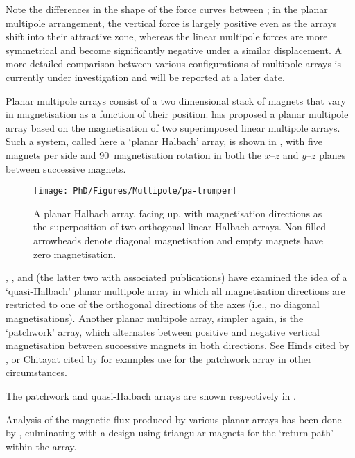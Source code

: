 \documentclass[11pt,a4paper]{memoir}
\begin{document}
Note the differences in the shape of the force curves between ; in the planar multipole arrangement, the vertical force is largely positive even as the arrays shift into their attractive zone, whereas the linear multipole forces are more symmetrical and become significantly negative under a similar displacement. A more detailed comparison between various configurations of multipole arrays is currently under investigation and will be reported at a later date.

Planar multipole arrays consist of a two dimensional stack of magnets that vary in magnetisation as a function of their position. \textcite[Appendix~A]{kim1997-thesis} has proposed a planar multipole array based on the magnetisation of two superimposed linear multipole arrays. Such a system, called here a `planar Halbach' array, is shown in , with five magnets per side and 90\textdegree\ magnetisation rotation in both the $x$--$z$ and $y$--$z$ planes between successive magnets.

\begin{figure}
\centering
\texttt{[image: PhD/Figures/Multipole/pa-trumper]}
\caption{A planar Halbach array, facing up, with magnetisation directions as the superposition of two orthogonal linear Halbach arrays. Non-filled arrowheads denote diagonal magnetisation and empty magnets have zero magnetisation.}
\end{figure}


\textcite{moser2002-maglev}, \textcite{rovers2009-ietm}, and \textcite{janssen2009-jsdd} (the latter two with associated publications) have examined the idea of a `quasi-Halbach' planar multipole array in which all magnetisation directions are restricted to one of the orthogonal directions of the axes (i.e., no diagonal magnetisations).
Another planar multipole array, simpler again, is the `patchwork' array, which alternates between positive and negative vertical magnetisation between successive magnets in both directions.
See Hinds cited by \textcite{kim1997-thesis}, or Chitayat cited by \textcite{cho2001} for examples use for the patchwork array in other circumstances.

The patchwork and quasi-Halbach arrays are shown respectively in .

Analysis of the magnetic flux produced by various planar arrays has been done by \textcite{cho2001}, culminating with a design using triangular magnets for the `return path' within the array.
\end{document}
